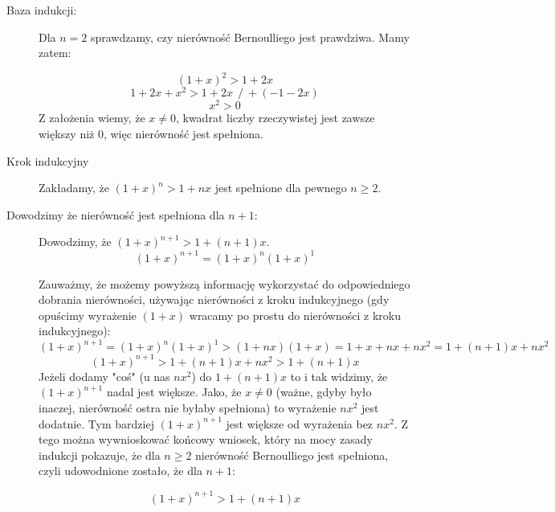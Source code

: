 \documentclass[a4paper,oneside,openright,11pt]{article}
\numberwithin{equation}{section}
\begin{document}
\begin{description}
    \item[Baza indukcji:] Dla $n = 2$ sprawdzamy, czy nierówność Bernoulliego jest prawdziwa. Mamy zatem:
    
    \begin{equation*}
        (1 + x)^{2} > 1 + 2x
    \end{equation*}
    \begin{equation*}
        1 + 2x + x^{2} > 1 + 2x \ \ / \ +(-1 -2x)
    \end{equation*}
    \begin{equation*}
        x^2 > 0
    \end{equation*}
    Z założenia wiemy, że $x \neq 0$, kwadrat liczby rzeczywistej jest zawsze większy niż $0$, więc nierówność jest spełniona.
    \item[Krok indukcyjny] Zakładamy, że $(1 + x)^{n} > 1 + nx$ jest spełnione dla pewnego $n \geq 2$.
   
    \item[Dowodzimy że nierówność jest spełniona dla $n + 1$:] Dowodzimy, że $(1 + x)^{n + 1} > 1 + (n + 1)x$. 
    \begin{equation*}
        (1 + x)^{n + 1} = (1 + x)^{n} (1 + x)^{1}
    \end{equation*}

    Zauważmy, że możemy powyższą informację wykorzystać do odpowiedniego dobrania nierówności, używając nierówności z kroku indukcyjnego (gdy opuścimy
    wyrażenie $(1 + x)$ wracamy po prostu do nierówności z kroku indukcyjnego):
    \begin{equation*}
        (1 + x)^{n + 1} = (1 + x)^{n} (1 + x)^{1} > (1 + nx)(1 + x) = 1 + x + nx + nx^2 = 1 + (n + 1)x + nx^2
    \end{equation*}
    \begin{equation*}
        (1 + x)^{n + 1} > 1 + (n + 1)x + nx^2 > 1 + (n + 1)x
    \end{equation*}
    Jeżeli dodamy "coś" (u nas $nx^2$) do $1 + (n + 1)x$ to i tak widzimy, że $(1 + x)^{n + 1}$ nadal jest większe. Jako, że $x \neq 0$
    (ważne, gdyby było inaczej, nierówność ostra nie byłaby spełniona) to wyrażenie $nx^2$ jest dodatnie. Tym bardziej $(1 + x)^{n + 1}$ jest większe od wyrażenia bez $nx^2$.
    Z tego można wywnioskować końcowy wniosek, który na mocy zasady indukcji pokazuje, że dla $n \geq 2$ nierówność Bernoulliego jest spełniona, czyli
    udowodnione zostało, że dla $n + 1$:

    \begin{equation*}
        (1 + x)^{n + 1} > 1 + (n + 1)x
    \end{equation*}
\end{description}
\end{document}
